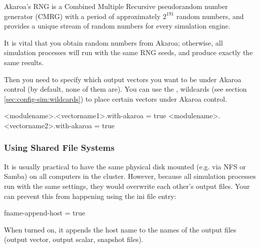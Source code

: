 Akaroa's RNG is a Combined Multiple Recursive pseudorandom
number generator (CMRG) with a period of approximately $2^{191}$
random numbers, and provides a unique stream of random numbers
for every simulation engine.

\begin{note}
It is vital that you obtain random numbers from Akaroa; otherwise,
all simulation processes will run with the same RNG seeds, and
produce exactly the same results.
\end{note}

Then you need to specify which output vectors you want to
be under Akaroa control (by default, none of them are).
You can use the \ttt{*}, \ttt{**} wildcards (see
section \ref{sec:config-sim:wildcards}) to
place certain vectors under Akaroa control.

\begin{inifile}
<modulename>.<vectorname1>.with-akaroa = true
<modulename>.<vectorname2>.with-akaroa = true
\end{inifile}


\subsubsection{Using Shared File Systems}
\label{sec:run-sim:akaroa-using-shared-filesystems}

It is usually practical to have the same physical disk mounted (e.g. via NFS or
Samba) on all computers in the cluster. However, because all {\opp} simulation
processes run with the same settings, they would overwrite each other's
output files. Your can prevent this from happening using the
 ini file entry:

\begin{inifile}
[General]
fname-append-host = true
\end{inifile}

When turned on, it appends the host name to the names of the output
files (output vector, output scalar, snapshot files).



